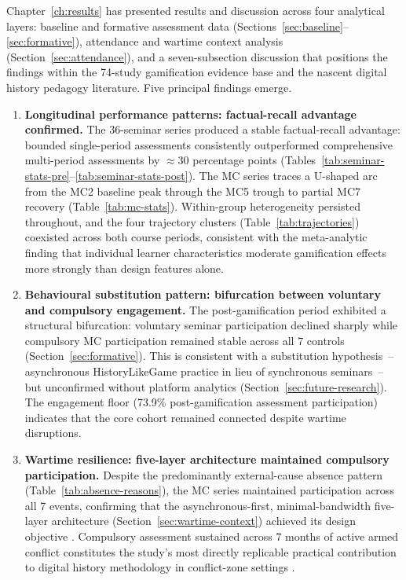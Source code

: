 Chapter~\ref{ch:results} has presented results and discussion across four analytical layers:
baseline and formative assessment data (Sections~\ref{sec:baseline}--\ref{sec:formative}),
attendance and wartime context analysis (Section~\ref{sec:attendance}),
and a seven-subsection discussion that positions the findings within the 74-study
gamification evidence base and the nascent digital history pedagogy literature.
Five principal findings emerge.

\begin{enumerate}

\item \textbf{Longitudinal performance patterns: factual-recall advantage confirmed.}
The 36-seminar series produced a stable factual-recall advantage: bounded single-period assessments consistently outperformed comprehensive multi-period assessments by $\approx$30 percentage points (Tables~\ref{tab:seminar-stats-pre}--\ref{tab:seminar-stats-post}). The MC series traces a U-shaped arc from the MC2 baseline peak through the MC5 trough to partial MC7 recovery (Table~\ref{tab:mc-stats}). Within-group heterogeneity persisted throughout, and the four trajectory clusters (Table~\ref{tab:trajectories}) coexisted across both course periods, consistent with the meta-analytic finding \cite{SailerHomner2020, BaiHewHuang2020} that individual learner characteristics moderate gamification effects more strongly than design features alone.

\item \textbf{Behavioural substitution pattern: bifurcation between voluntary and compulsory engagement.}
The post-gamification period exhibited a structural bifurcation: voluntary seminar participation declined sharply while compulsory MC participation remained stable across all 7 controls (Section~\ref{sec:formative}). This is consistent with a substitution hypothesis~-- asynchronous HistoryLikeGame practice in lieu of synchronous seminars~-- but unconfirmed without platform analytics (Section~\ref{sec:future-research}). The engagement floor (73.9\% post-gamification assessment participation) indicates that the core cohort remained connected despite wartime disruptions.

\item \textbf{Wartime resilience: five-layer architecture maintained compulsory participation.}
Despite the predominantly external-cause absence pattern (Table~\ref{tab:absence-reasons}), the MC series maintained participation across all 7 events, confirming that the asynchronous-first, minimal-bandwidth five-layer architecture (Section~\ref{sec:wartime-context}) achieved its design objective \cite{Burde2017, UNESCO2023}. Compulsory assessment sustained across 7 months of active armed conflict constitutes the study's most directly replicable practical contribution to digital history methodology in conflict-zone settings \cite{Martynets202428, Zamkova2023299, Hlianenko2024}.


\end{enumerate}
